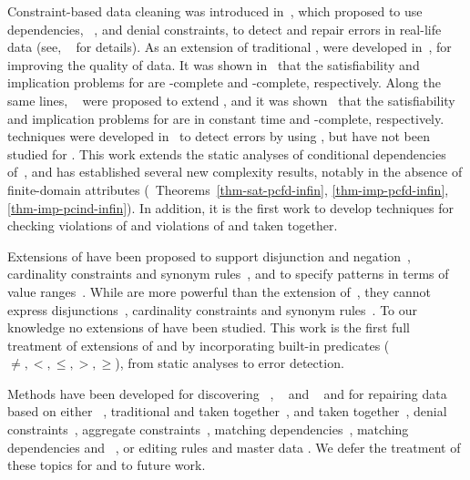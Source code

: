 Constraint-based data cleaning was introduced in~\cite{leo99}, which
proposed to use dependencies, \eg~\FDs, \INDs and denial
constraints, to detect and repair errors in real-life data (see,
\eg~\cite{AbHuVi1995,Chomicki07,book-Fan} for details). As an extension
of traditional \FDs, \CFDs were developed in~\cite{CFDs}, for
improving the quality of data. It was shown in~\cite{CFDs} that the
satisfiability and implication problems for \CFDs are \NP-complete
and \coNP-complete, respectively. Along the same lines, \CINDs~\cite{tcs-CINDs} were proposed to extend \INDs, and it was shown~\cite{tcs-CINDs}
that the satisfiability and implication problems for \CINDs are in
constant time and \EXPTIME-complete, respectively. \SQL techniques
were developed in~\cite{CFDs} to detect errors by using \CFDs, but
have not been studied for \CINDs. This work extends the static
analyses of conditional dependencies of~\cite{CFDs,tcs-CINDs}, and has
established several new complexity results, notably in the absence
of finite-domain attributes (\eg~Theorems~\ref{thm-sat-pcfd-infin},
\ref{thm-imp-pcfd-infin}, \ref{thm-imp-pcind-infin}). In addition,
it is the first work to develop \SQL techniques for checking
violations of \CINDs and violations of \pCFDs and \pCINDs taken
together.





Extensions of \CFDs have been proposed to support disjunction and
negation~\cite{icde08}, cardinality constraints and synonym
rules~\cite{ChenFM09}, and to specify patterns in terms of value
ranges~\cite{divesh08}. While \pCFDs are more powerful than the
extension of~\cite{divesh08}, they cannot express
disjunctions~\cite{icde08}, cardinality constraints and synonym
rules~\cite{ChenFM09}. To our knowledge no extensions of \CINDs have
been studied. This work is the first full treatment of extensions of
\CFDs and \CINDs by incorporating built-in predicates ($\ne, <, \le,
>, \ge$), from static analyses to error detection.

Methods have been developed for discovering
\CFDs~\cite{CM08,divesh08}, \pCFDs~\cite{ZanziT14} and \CINDs~\cite{BauckmannALMN12} and for repairing data based on
either \CFDs~\cite{repair}, traditional \FDs and \INDs taken
together~\cite{sigmod05}, \CFDs and \CINDs taken
together~\cite{jdiq-Cure12}, denial
constraints~\cite{BertossiBFL08,ChomickiM05}, aggregate
constraints~\cite{FlescaFP05}, matching dependencies~\cite{FanGJLM11-md}, matching dependencies and \CFDs~\cite{FanLMTY-interaction}, or editing rules and master data \cite{FanLMTY12-vldbj}. We defer the treatment of these topics for \pCFDs and \pCINDs to future work.




